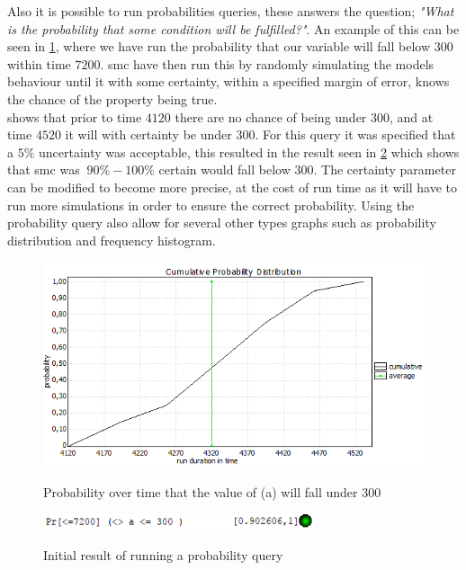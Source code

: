 Also it is possible to run probabilities queries, these answers the question; \textit{"What is the probability that some condition will be fulfilled?"}. An example of this can be seen in \cref{fig:pra300}, where we have run the probability that our variable  will fall below $300$ within time $7200$. \Gls{smc} have then run this by randomly simulating the models behaviour until it with some certainty, within a specified margin of error, knows the chance of the property being true.\\
 shows that prior to time $4120$ there are no chance of  being under $300$, and at time $4520$ it will with certainty be under $300$. For this query it was specified that a $5\%$ uncertainty was acceptable, this resulted in the result seen in \cref{fig:pra300pct} which shows that \gls{smc} was $~90\% - 100\%$ certain  would fall below $300$. The certainty parameter can be modified to become more precise, at the cost of run time as it will have to run more simulations in order to ensure the correct probability. Using the probability query also allow  for several other types graphs such as probability distribution and frequency histogram.

\begin{figure}[h]
	\includegraphics[width=\textwidth]{graphics/pra300.png}
	\label{fig:pra300}
	\caption{Probability over time that the value of (a) will fall under 300}
\end{figure}

\begin{figure}[h]
	\centering
	\includegraphics[width=8cm]{graphics/pra300pct.png}
	\label{fig:pra300pct}
	\caption{Initial result of running a probability query}
\end{figure}


